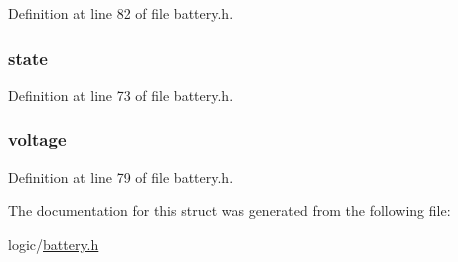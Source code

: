 \-Definition at line 82 of file battery.\-h.

\hypertarget{structbatt_ac6b2518df4ca45cee089e61f152572b2}{
\subsubsection[{state}]{ {\bf state}}}\label{structbatt_ac6b2518df4ca45cee089e61f152572b2}


\-Definition at line 73 of file battery.\-h.

\hypertarget{structbatt_ad769a752524b8ab13170d3e4940686de}{
\subsubsection[{voltage}]{ {\bf voltage}}}\label{structbatt_ad769a752524b8ab13170d3e4940686de}


\-Definition at line 79 of file battery.\-h.



\-The documentation for this struct was generated from the following file\-:\begin{DoxyCompactItemize}
\item 
logic/\hyperlink{battery_8h}{battery.\-h}\end{DoxyCompactItemize}
